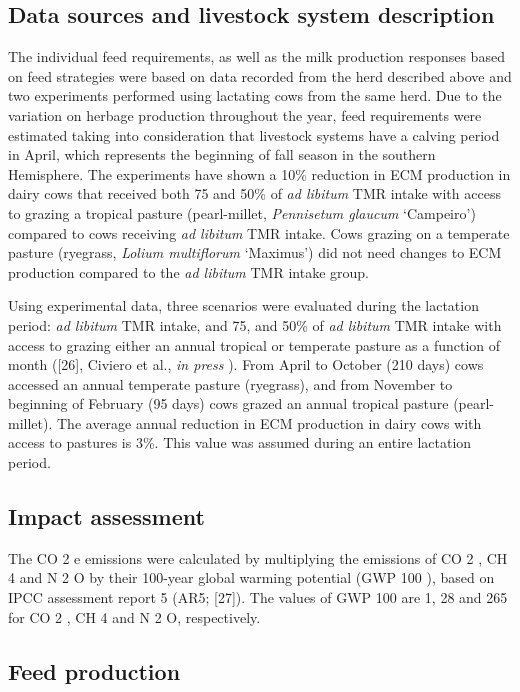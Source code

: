 \documentclass[11pt,a4paper]{article}
\begin{document}
\subsection{Data sources and livestock system description}

The individual feed requirements, as well as the milk production responses based on feed strategies were based on data recorded from the herd described above and two experiments performed using lactating cows from the same herd. Due to the variation on herbage production throughout the year, feed requirements were estimated taking into consideration that livestock systems have a calving period in April, which represents the beginning of fall season in the southern Hemisphere. The experiments have shown a 10\% reduction in ECM production in dairy cows that received both 75 and 50\% of \textit{ad libitum} TMR intake with access to grazing a tropical pasture (pearl-millet, \textit{Pennisetum glaucum} ‘Campeiro’) compared to cows receiving \textit{ad libitum} TMR intake. Cows grazing on a temperate pasture (ryegrass, \textit{Lolium multiflorum} ‘Maximus’) did not need changes to ECM production compared to the \textit{ad libitum} TMR intake group.

Using experimental data, three scenarios were evaluated during the lactation period: \textit{ad libitum} TMR intake, and 75, and 50\% of \textit{ad libitum} TMR intake with access to grazing either an annual tropical or temperate pasture as a function of month ([26], Civiero et al., \textit{in press} ). From April to October (210 days) cows accessed an annual temperate pasture (ryegrass), and from November to beginning of February (95 days) cows grazed an annual tropical pasture (pearl-millet). The average annual reduction in ECM production in dairy cows with access to pastures is 3\%. This value was assumed during an entire lactation period.

\subsection{Impact assessment}

The CO 2 e emissions were calculated by multiplying the emissions of CO 2 , CH 4 and N 2 O by their 100-year global warming potential (GWP 100 ), based on IPCC assessment report 5 (AR5; [27]). The values of GWP 100 are 1, 28 and 265 for CO 2 , CH 4 and N 2 O, respectively.

\subsection{Feed production}
\end{document}
